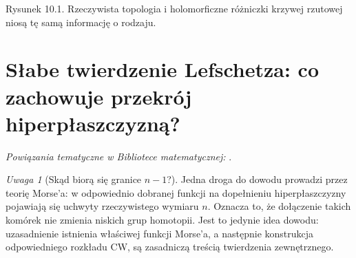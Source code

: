 \documentclass[11pt,a4paper,openany]{report}
\numberwithin{equation}{section}
\theoremstyle{plain}
\theoremstyle{definition}
\theoremstyle{remark}
\newtheorem{uwaga}[twierdzenie]{Uwaga}
\begin{document}
\begin{center}

{\small Rysunek 10.1. Rzeczywista topologia i holomorficzne różniczki
krzywej rzutowej niosą tę samą informację o rodzaju.}\par
\end{center}

\section{Słabe twierdzenie Lefschetza: co zachowuje przekrój hiperpłaszczyzną?}
\label{sec:ga10-weak}

\noindent\emph{Powiązania tematyczne w Bibliotece matematycznej:} .




\begin{uwaga}[Skąd biorą się granice $n-1$?]
Jedna droga do dowodu prowadzi przez teorię Morse'a:
w odpowiednio dobranej funkcji na dopełnieniu hiperpłaszczyzny
pojawiają się uchwyty rzeczywistego wymiaru $n$.
Oznacza to, że dołączenie takich komórek nie zmienia
niskich grup homotopii. Jest to jedynie idea dowodu:
uzasadnienie istnienia właściwej funkcji Morse'a,
a następnie konstrukcja odpowiedniego rozkładu CW,
są zasadniczą treścią twierdzenia zewnętrznego.
\end{uwaga}
\end{document}

